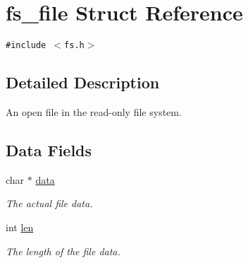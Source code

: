 \hypertarget{a00026}{
\section{fs\_\-file Struct Reference}
\label{a00026}
}
{\tt \#include $<$fs.h$>$}



\subsection{Detailed Description}
An open file in the read-only file system. 

\subsection*{Data Fields}
\begin{CompactItemize}
\item 
\hypertarget{a00026_5fb7fc1c9a64d9634f7573a2562173c4}{
char $\ast$ \hyperlink{a00026_5fb7fc1c9a64d9634f7573a2562173c4}{data}}
\label{a00026_5fb7fc1c9a64d9634f7573a2562173c4}

\begin{CompactList}\small\item\em The actual file data. \item\end{CompactList}\item 
\hypertarget{a00082_g99a16a5082bf9510cb1cb8069402f1f0}{
int \hyperlink{a00082_g99a16a5082bf9510cb1cb8069402f1f0}{len}}
\label{a00082_g99a16a5082bf9510cb1cb8069402f1f0}

\begin{CompactList}\small\item\em The length of the file data. \item\end{CompactList}\end{CompactItemize}
